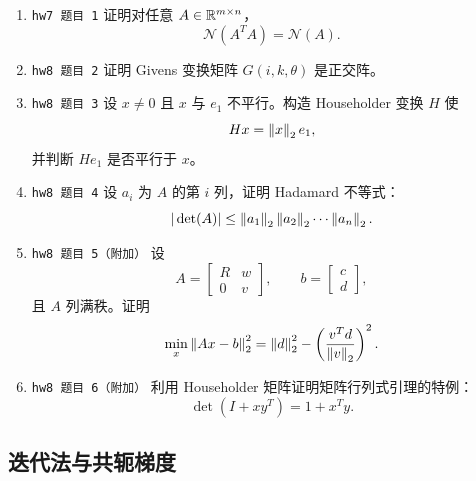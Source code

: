\documentclass{article}
\begin{document}
\begin{enumerate}
  \item \texttt{hw7 题目 1} 证明对任意 $A\in\mathbb{R}^{m\times n}$，
  \[
    \mathcal N(A^TA)=\mathcal N(A).
  \]

  \item \texttt{hw8 题目 2} 证明 Givens 变换矩阵 $G(i,k,\theta)$ 是正交阵。

  \item \texttt{hw8 题目 3} 设 $x\ne0$ 且 $x$ 与 $e_1$ 不平行。构造 Householder 变换 $H$ 使
  \[
    Hx=\left\| x \right\|_2e_1,
  \]
  并判断 $He_1$ 是否平行于 $x$。

  \item \texttt{hw8 题目 4} 设 $a_i$ 为 $A$ 的第 $i$ 列，证明 Hadamard 不等式：
  \[
    |\det(A)|\le \left\| a_1 \right\|_2\left\| a_2 \right\|_2\cdots\left\| a_n \right\|_2.
  \]

  \item \texttt{hw8 题目 5（附加）} 设
  \[
    A=\begin{bmatrix}R&w\\0&v\end{bmatrix},\qquad
    b=\begin{bmatrix}c\\d\end{bmatrix},
  \]
  且 $A$ 列满秩。证明
  \[
    \min_x\left\| Ax-b \right\|_2^2=\left\| d \right\|_2^2-\left(\frac{v^Td}{\left\| v \right\|_2}\right)^2.
  \]

  \item \texttt{hw8 题目 6（附加）} 利用 Householder 矩阵证明矩阵行列式引理的特例：
  \[
    \det(I+xy^T)=1+x^Ty.
  \]
\end{enumerate}

\subsection{迭代法与共轭梯度}
\end{document}
